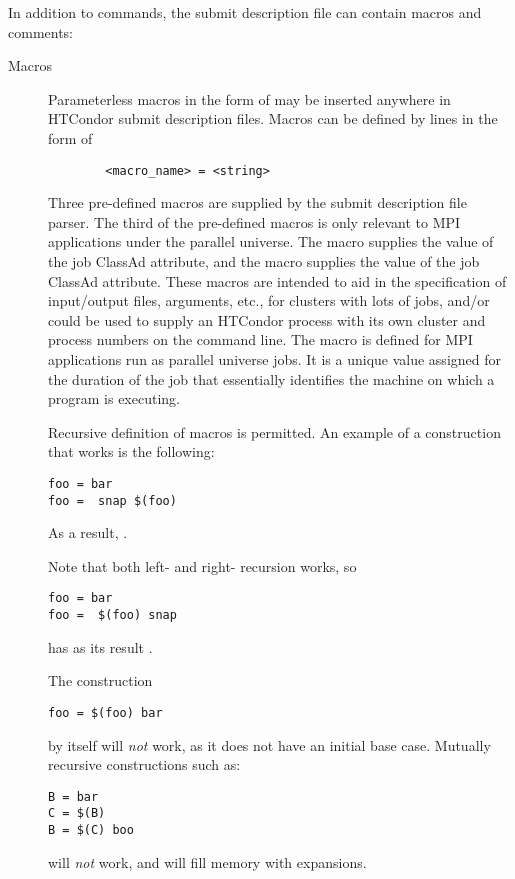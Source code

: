 \label{macro-in-submit-description-file}
In addition to commands, the submit description file can contain macros
and comments:

\begin{description}

\item[Macros] Parameterless macros in the form of 
may be inserted anywhere in HTCondor submit description files. Macros can be
defined by lines in the form of 
\begin{verbatim} 
        <macro_name> = <string> 
\end{verbatim} 
Three pre-defined macros are supplied by the submit description file parser.
The third of the pre-defined macros is only relevant to MPI applications
under the parallel universe.
The
 macro supplies the value of the
 job
ClassAd attribute, and the
 macro supplies the value of the
 job
ClassAd attribute.
These macros are
intended to aid in the specification of input/output files, arguments,
etc., for clusters with lots of jobs, and/or could be used to supply an
HTCondor process with its own cluster and process numbers on the command
line.
The 
 macro is defined for MPI applications run
as parallel universe jobs.
It is a unique value assigned for the duration of the job
that essentially identifies the machine on which a program is
executing.

Recursive definition of macros is permitted.
An example of a construction that works is the following: 
\begin{verbatim}
foo = bar
foo =  snap $(foo)
\end{verbatim}
As a result, .

Note that both left- and right- recursion works, so 
\begin{verbatim}
foo = bar
foo =  $(foo) snap
\end{verbatim}
has as its result .

The construction 
\begin{verbatim}
foo = $(foo) bar 
\end{verbatim}
by itself will \emph{not} work, as it does not have an initial base case.
Mutually recursive constructions such as: 
\begin{verbatim}
B = bar 
C = $(B)
B = $(C) boo
\end{verbatim}
will \emph{not} work, and will fill memory with expansions.


\end{description}
